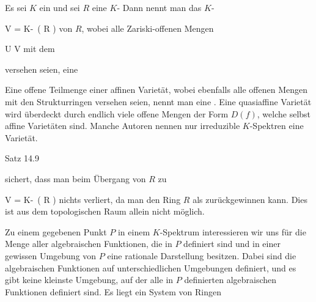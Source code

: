 \setcounter{section}{15}








{}
{





Es sei $K$ ein
und sei $R$ eine
$K$-
Dann nennt man das
$K$-

\mavergleichskette
{\vergleichskette
{ V
}
{ = }{ K\!-\!\, \left(  R  \right)
}
{  }{
}
{    }{
}
{   }{
}
}
{}{}{}
von $R$, wobei alle Zariski-offenen Mengen

\mavergleichskette
{\vergleichskette
{ U
}
{ \subseteq }{ V
}
{  }{
}
{    }{
}
{   }{
}
}
{}{}{}
mit dem

 versehen seien, eine 





}

Eine offene Teilmenge einer affinen Varietät, wobei ebenfalls alle offenen Mengen mit den Strukturringen versehen seien, nennt man eine  {.} Eine quasiaffine Varietät wird überdeckt durch endlich viele offene Mengen der Form $D(f)$, welche selbst affine Varietäten sind. Manche Autoren nennen nur irreduzible $K$-Spektren eine Varietät.

Satz 14.9

sichert, dass man beim Übergang von $R$ zu

\mavergleichskette
{\vergleichskette
{ V
}
{ = }{ K\!-\!\, \left(  R  \right)
}
{  }{
}
{    }{
}
{   }{
}
}
{}{}{}
nichts verliert, da man den Ring $R$ als
 zurückgewinnen kann. Dies ist aus dem topologischen Raum allein nicht möglich.






Zu einem gegebenen Punkt $P$ in einem $K$-Spektrum interessieren wir uns für die Menge aller algebraischen Funktionen, die in $P$ definiert sind und in einer gewissen Umgebung von $P$ eine rationale Darstellung besitzen. Dabei sind die algebraischen Funktionen auf unterschiedlichen Umgebungen definiert, und es gibt keine kleinste Umgebung, auf der alle in $P$ definierten algebraischen Funktionen definiert sind. Es liegt ein System von Ringen

